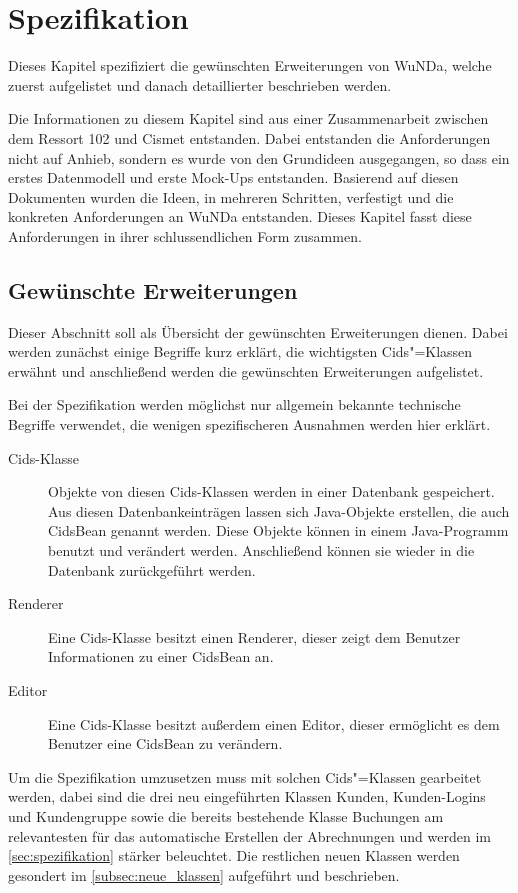 \chapter{Spezifikation} \label{ch:spezi}
Dieses Kapitel spezifiziert die gewünschten Erweiterungen von \ac{WuNDa}, welche zuerst aufgelistet und danach detaillierter beschrieben werden.

Die Informationen zu diesem Kapitel sind aus einer Zusammenarbeit zwischen dem Ressort 102 und Cismet entstanden.
Dabei entstanden die Anforderungen nicht auf Anhieb, sondern es wurde von den Grundideen ausgegangen, so dass ein erstes Datenmodell und erste Mock-Ups entstanden.
Basierend auf diesen Dokumenten wurden die Ideen, in mehreren Schritten, verfestigt und die konkreten Anforderungen an \ac{WuNDa} entstanden.
Dieses Kapitel fasst diese Anforderungen in ihrer schlussendlichen Form zusammen. 

\section{Gewünschte Erweiterungen} \label{sec:gewuenschte-erweiterungen}
Dieser Abschnitt soll als Übersicht der gewünschten Erweiterungen dienen.
Dabei werden zunächst einige Begriffe kurz erklärt, die wichtigsten Cids"=Klassen erwähnt und anschließend werden die gewünschten Erweiterungen aufgelistet.

Bei der Spezifikation werden möglichst nur allgemein bekannte technische Begriffe verwendet, die wenigen spezifischeren Ausnahmen werden hier erklärt.
\begin{description}
\item[Cids-Klasse] Objekte von diesen Cids-Klassen werden in einer Datenbank gespeichert.
Aus diesen Datenbankeinträgen lassen sich Java-Objekte erstellen, die auch CidsBean genannt werden.
Diese Objekte können in einem Java-Programm benutzt und verändert werden.
Anschließend können sie wieder in die Datenbank zurückgeführt werden.
\item[Renderer] Eine Cids-Klasse besitzt einen Renderer, dieser zeigt dem Benutzer Informationen zu einer CidsBean an.
\item[Editor] Eine Cids-Klasse besitzt außerdem einen Editor, dieser ermöglicht es dem Benutzer eine CidsBean zu verändern.
\end{description}

Um die Spezifikation umzusetzen muss mit solchen Cids"=Klassen gearbeitet werden, dabei sind die drei neu eingeführten Klassen Kunden, Kunden-Logins und Kundengruppe sowie die bereits bestehende Klasse Buchungen am relevantesten für das automatische Erstellen der Abrechnungen und werden im \autoref{sec:spezifikation} stärker beleuchtet. 
Die restlichen neuen Klassen werden gesondert im \autoref{subsec:neue_klassen} aufgeführt und beschrieben.

